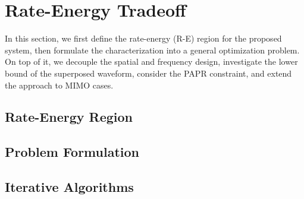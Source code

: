 \chapter{Rate-Energy Tradeoff}
In this section, we first define the rate-energy (R-E) region for the proposed system, then formulate the characterization into a general optimization problem. On top of it, we decouple the spatial and frequency design, investigate the lower bound of the superposed waveform, consider the PAPR constraint, and extend the approach to MIMO cases.

\section{Rate-Energy Region}\label{sec:rate-energy-region}
  

\section{Problem Formulation}\label{sec:problem-formulation}
  

\section{Iterative Algorithms}\label{sec:iterative-algorithms}
  